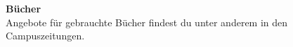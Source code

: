\begin{multicols}{2}




\textbf{Bücher} \\
Angebote für gebrauchte Bücher findest du unter anderem in den Campuszeitungen.





\end{multicols}

